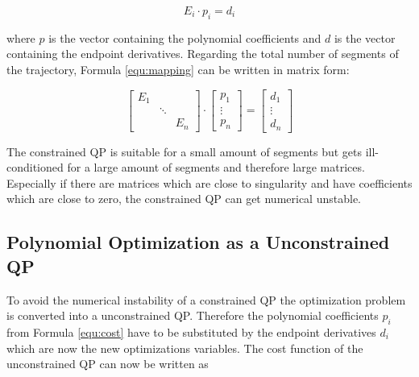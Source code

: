 \begin{equation}
E_i \cdot p_i = d_i
\label{equ:mapping}
\end{equation}

where $p$ is the vector containing the polynomial coefficients and $d$ is the vector containing the endpoint derivatives. Regarding the total number of segments of the trajectory, Formula \ref{equ:mapping} can be written in matrix form:

\begin{equation}
\begin{bmatrix}
   E_1 &  &  \\
    & \ddots &  \\
   & & E_n
\end{bmatrix} 
\cdot
\begin{bmatrix}
   p_1 \\
\vdots \\
  p_n
\end{bmatrix}
=
\begin{bmatrix}
   d_1 \\
\vdots \\
  d_n
\end{bmatrix}
\end{equation} 

The constrained QP is suitable for a small amount of segments but gets ill-conditioned for a large amount of segments and therefore large matrices. Especially if there are matrices which are close to singularity and have coefficients which are close to zero, the constrained QP can get numerical unstable.

\subsection{Polynomial Optimization as a Unconstrained QP}\label{sec:polynomialQP}

To avoid the numerical instability of a constrained QP the optimization problem is converted into a unconstrained QP. Therefore the polynomial coefficients $p_i$ from Formula \ref{equ:cost} have to be substituted by the endpoint derivatives $d_i$ which are now the new optimizations variables. The cost function of the unconstrained QP can now be written as 


